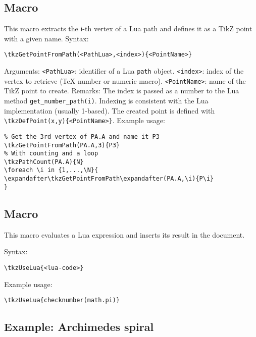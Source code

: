\subsection{Macro }
This macro extracts the i-th vertex of a Lua path and defines it as a TikZ point with a given name.
\medskip
\noindent
Syntax:
\begin{verbatim}
\tkzGetPointFromPath(<PathLua>,<index>){<PointName>}
\end{verbatim}
\noindent
Arguments:
\verb|<PathLua>|: identifier of a Lua \verb|path| object.
\verb|<index>|: index of the vertex to retrieve (TeX number or numeric macro).
\verb|<PointName>|: name of the TikZ point to create.
\medskip
\noindent
Remarks:
The index is passed as a number to the Lua method \verb|get_number_path(i)|.
Indexing is consistent with the Lua implementation (usually 1-based).
The created point is defined with \verb|\tkzDefPoint(x,y){<PointName>}|.
\medskip
\noindent
Example usage:
\begin{mybox}
\begin{verbatim}
% Get the 3rd vertex of PA.A and name it P3
\tkzGetPointFromPath(PA.A,3){P3}
% With counting and a loop
\tkzPathCount(PA.A){N}
\foreach \i in {1,...,\N}{
\expandafter\tkzGetPointFromPath\expandafter(PA.A,\i){P\i}
}
\end{verbatim}
\end{mybox}

\subsection{Macro }

This macro evaluates a Lua expression and inserts its result in the document.

\medskip
\noindent
Syntax:

\begin{verbatim}
\tkzUseLua{<lua-code>}
\end{verbatim}

\noindent
Example usage:

\begin{mybox}
\begin{verbatim}
\tkzUseLua{checknumber(math.pi)}
\end{verbatim}
\end{mybox}

\subsection{Example: Archimedes spiral}

